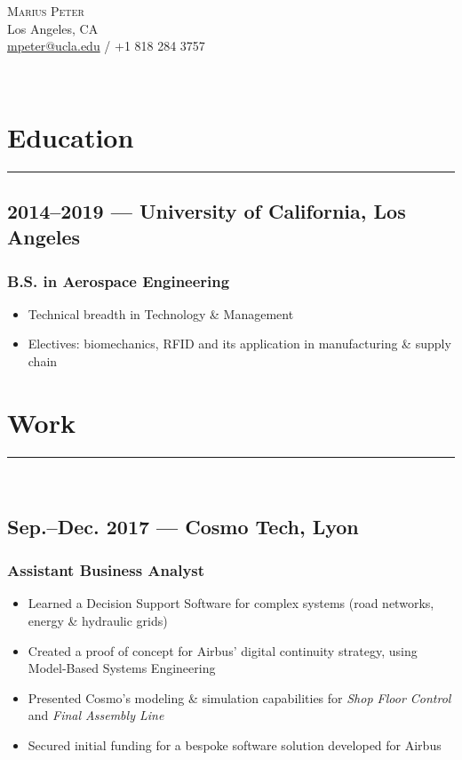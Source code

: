 \documentclass[10pt]{article}
\begin{document}
\renewcommand\labelitemi{-}
\begin{center}
    \huge \textsc{Marius Peter}\\[0.2cm]

    \normalsize
    Los Angeles, CA\\
    \href{mailto:mpeter@ucla.edu}{mpeter@ucla.edu} / +1 818 284 3757\\
\end{center}

\vfill~
\section*{Education}
\rule{\linewidth}{1pt}
\subsection*{2014--2019 --- University of California, Los Angeles}
\subsubsection*{B.S. in Aerospace Engineering}
\begin{itemize}
    \item Technical breadth in Technology \& Management
    \item Electives: biomechanics, RFID and its application in manufacturing \& supply chain
\end{itemize}

\section*{Work}
\rule{\linewidth}{1pt}\\
\subsection*{Sep.--Dec. 2017 --- Cosmo Tech, Lyon}
\subsubsection*{Assistant Business Analyst}
\begin{itemize}
    \item Learned a Decision Support Software for complex systems (road networks, energy \& hydraulic grids)
    \item Created a proof of concept for Airbus’ digital continuity strategy, using Model-Based Systems Engineering
    \item Presented Cosmo’s modeling \& simulation capabilities for \textit{Shop Floor Control} and \textit{Final Assembly Line}
    \item Secured initial funding for a bespoke software solution developed for Airbus
\end{itemize}
\end{document}
